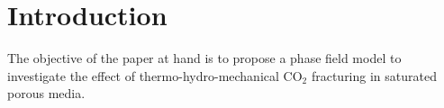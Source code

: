 \section{Introduction}

The objective of the paper at hand is to propose a phase field model to investigate the effect of thermo-hydro-mechanical CO$_2$ fracturing in saturated porous media.

